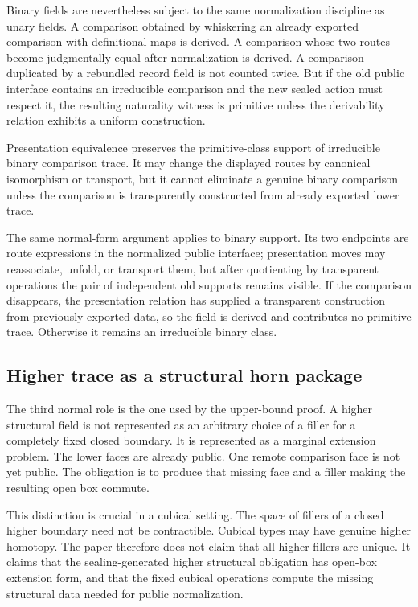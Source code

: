 \documentclass{lmcs}
\begin{document}
Binary fields are nevertheless subject to the same normalization discipline as unary fields.
A comparison obtained by whiskering an already exported comparison with definitional maps
is derived.  A comparison whose two routes become judgmentally equal after normalization is
derived.  A comparison duplicated by a rebundled record field is not counted twice.  But if
the old public interface contains an irreducible comparison and the new sealed action must
respect it, the resulting naturality witness is primitive unless the derivability relation
exhibits a uniform construction.

\begin{lem}
Presentation equivalence preserves the primitive-class support of irreducible binary
comparison trace.  It may change the displayed routes by canonical isomorphism or transport,
but it cannot eliminate a genuine binary comparison unless the comparison is transparently
constructed from already exported lower trace.
\end{lem}

The same normal-form argument applies to binary support.  Its two endpoints are route
expressions in the normalized public interface; presentation moves may reassociate, unfold, or
transport them, but after quotienting by transparent operations the pair of independent old
supports remains visible.  If the comparison disappears, the presentation relation has supplied
a transparent construction from previously exported data, so the field is derived and
contributes no primitive trace.  Otherwise it remains an irreducible binary class.

\subsection{Higher trace as a structural horn package}

The third normal role is the one used by the upper-bound proof.  A higher structural field is
not represented as an arbitrary choice of a filler for a completely fixed closed boundary.  It
is represented as a marginal extension problem.  The lower faces are already public.  One
remote comparison face is not yet public.  The obligation is to produce that missing face and
a filler making the resulting open box commute.

This distinction is crucial in a cubical setting.  The space of fillers of a closed higher
boundary need not be contractible.  Cubical types may have genuine higher homotopy.  The
paper therefore does not claim that all higher fillers are unique.  It claims that the
sealing-generated higher structural obligation has open-box extension form, and that the
fixed cubical operations compute the missing structural data needed for public normalization.
\end{document}
